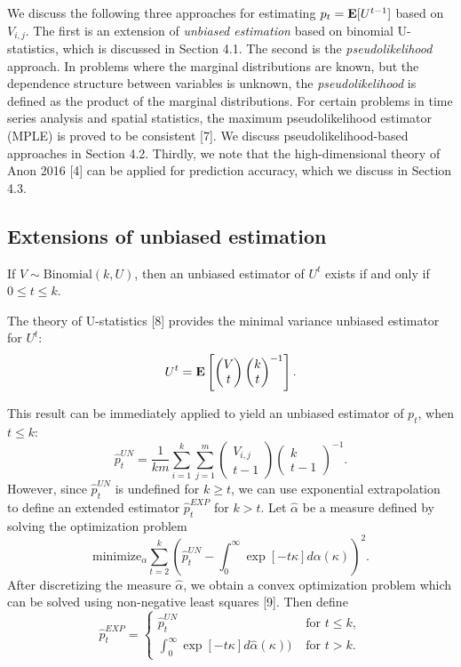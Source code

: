 \documentclass[12pt]{article}
\begin{document}
We discuss the following three approaches for estimating $p_t =
\textbf{E}[U^{t-1}]$ based on $V_{i, j}$.  The first is an extension of \emph{unbiased
  estimation} based on binomial U-statistics, which is discussed in
Section 4.1.  The second is the \emph{pseudolikelihood} approach.  In
problems where the marginal distributions are known, but the
dependence structure between variables is unknown, the
\emph{pseudolikelihood} is defined as the product of the marginal
distributions.  For certain problems in time series analysis and
spatial statistics, the maximum pseudolikelihood estimator (MPLE) is
proved to be consistent [7].  We discuss pseudolikelihood-based
approaches in Section 4.2.  Thirdly, we note that the high-dimensional
theory of Anon 2016 [4] can be applied for prediction accuracy, which we discuss in Section 4.3.

\subsection{Extensions of unbiased estimation}

If $V \sim \text{Binomial}(k, U)$, then an unbiased estimator of $U^t$ exists
if and only if $0 \leq t \leq k$.

The theory of U-statistics [8] provides the minimal variance unbiased estimator for $U^t$:
\[
U^t = \textbf{E}\left[\begin{pmatrix}
V \\ t
\end{pmatrix}
\begin{pmatrix}
k \\ t
\end{pmatrix}^{-1}\right].
\]

This result can be immediately applied to yield an unbiased estimator of $p_t$, when $t \leq k$:
\begin{equation}\label{eq:ustat}
\hat{p}_t^{UN} =  \frac{1}{km}\sum_{i=1}^k\sum_{j=1}^{m} \begin{pmatrix}
V_{i, j} \\ t-1
\end{pmatrix}
\begin{pmatrix}
k \\ t-1
\end{pmatrix}^{-1}.
\end{equation}
However, since $\hat{p}_t^{UN}$ is undefined for $k \geq t$, we can use exponential extrapolation
to define an extended estimator $\hat{p}_t^{EXP}$ for $k > t$.
Let $\hat{\alpha}$ be a measure defined by solving the optimization problem
\[
\text{minimize}_{\alpha} \sum_{t=2}^{k} \left(\hat{p}_t^{UN} - \int_0^\infty \exp[-t\kappa] d\alpha(\kappa)\right)^2.
\]
After discretizing the measure $\hat{\alpha}$, we obtain a convex optimization problem
which can be solved using non-negative least squares [9].
Then define
\[
\hat{p}_t^{EXP} = \begin{cases}
\hat{p}_t^{UN}&\text{ for }t \leq k,\\
\int_0^\infty \exp[-t\kappa] d\hat{\alpha}(\kappa))&\text{ for }t > k.
\end{cases}
\]
\end{document}
